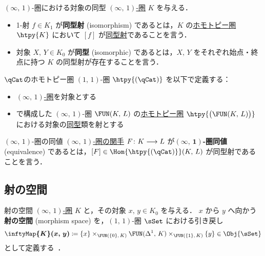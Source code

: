 \documentclass[TQFT_main]{subfiles}
\begin{document}
\begin{mydef}[label=def:isom-infty]{{$(\infty,\, 1)$}-圏における対象の同型}
    \hyperref[def:infinity-1]{$(\infty,\, 1)$-圏} $K$ を与える．
    \begin{itemize}
        \item 1-射 $f \in K_1$ が\textbf{同型射} (isomorphism) であるとは，$K$ の\hyperref[def:hcat-infty]{ホモトピー圏} $\htpy{K}$ において $[f]$ が\hyperref[def:iso]{同型射}であることを言う．
        \item 対象 $X,\, Y \in K_0$ が\textbf{同型} (isomorphic) であるとは，$X,\, Y$ をそれぞれ始点・終点に持つ $K$ の同型射が存在することを言う．
    \end{itemize}
\end{mydef}

\begin{mydef}[label=def:hqCat]{{$\qCat$}のホモトピー圏}
    $(1,\, 1)$-圏 $\htpy{(\qCat)}$ を以下で定義する：
    \begin{itemize}
        \item \hyperref[def:infinity-1]{$(\infty,\, 1)$-圏}を対象とする
        \item {}で構成した $(\infty,\, 1)$-圏 $\FUN(K,\, L)$ の\hyperref[def:hcat-infty]{ホモトピー圏} $\htpy{\bigl(\FUN(K,\, L)\bigr)}$ における対象の\hyperref[def:iso]{同型}類を射とする
    \end{itemize}
\end{mydef}

\begin{mydef}[label=def:equiv-infty]{{$(\infty,\, 1)$}-圏の同値}
    \hyperref[def:infinity-1]{$(\infty,\, 1)$-圏の関手} $F \colon K \longrightarrow L$ が\textbf{$\bm{(\infty,\, 1)}$-圏同値} (equivalence) であるとは，$[F] \in \Hom{\htpy{(\qCat)}}(K,\, L)$ が同型射であることを言う．
\end{mydef}

\subsection{射の空間}

\begin{mydef}[label=def:Map]{射の空間}
    \hyperref[def:infinity-1]{$(\infty,\, 1)$-圏} $K$ と，その対象 $x,\, y \in K_0$ を与える．
    $x$ から $y$ へ向かう\textbf{射の空間} (morphism space) を，$(1,\, 1)$-圏 $\sSet$ における引き戻し
    \begin{align}
        \bm{\inftyMap{K} (x,\, y)} \coloneqq \{x\} \times_{\FUN (\{0\},\, K)} \FUN (\Delta^1,\, K) \times_{\FUN (\{1\},\, K)} \{y\} \in \Obj{\sSet}
    \end{align}
    として定義する~\cite[\href{https://kerodon.net/tag/01J5}{Tag 01J5}]{kerodon}．
\end{mydef}
\end{document}
